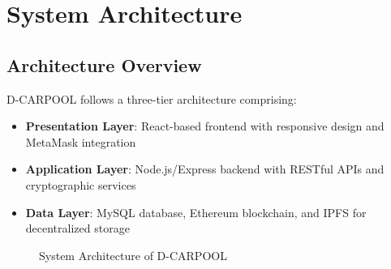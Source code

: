 \documentclass[12pt]{report}
\theoremstyle{plain}
\theoremstyle{definition}
\theoremstyle{remark}
\begin{document}
\chapter{System Architecture}

\section{Architecture Overview}

D-CARPOOL follows a three-tier architecture comprising:

\begin{itemize}
    \item \textbf{Presentation Layer}: React-based frontend with responsive design and MetaMask integration
    \item \textbf{Application Layer}: Node.js/Express backend with RESTful APIs and cryptographic services
    \item \textbf{Data Layer}: MySQL database, Ethereum blockchain, and IPFS for decentralized storage
\end{itemize}

\begin{figure}[H]
\centering
{}
\caption{System Architecture of D-CARPOOL}
\end{figure}
\end{document}
